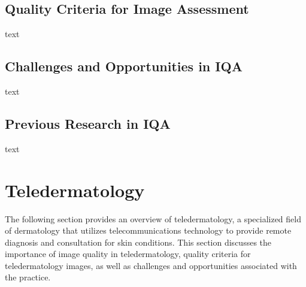 \subsection{Quality Criteria for Image Assessment}
\label{sub:QualityCriteria}
text \par
\vspace{\baselineskip}
\noindent

\subsection{Challenges and Opportunities in IQA}
\label{sub:ChallengesOpportunitiesIQA}
text \par
\vspace{\baselineskip}
\noindent

\subsection{Previous Research in IQA}
\label{sub:PreviousResearchIQA}
text \par
\vspace{\baselineskip}
\noindent



\section{Teledermatology}
\label{sec:Teledermatology}
The following section provides an overview of teledermatology, a specialized field of dermatology that utilizes telecommunications technology to provide remote diagnosis and consultation for skin conditions. This section discusses the importance of image quality in teledermatology, quality criteria for teledermatology images, as well as challenges and opportunities associated with the practice. \par
\vspace{\baselineskip}
\noindent

